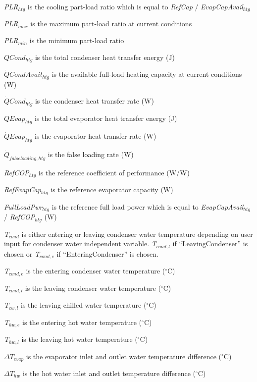 \emph{PLR\(_{htg}\)} is the cooling part-load ratio which is equal to \emph{RefCap} / \emph{EvapCapAvail\(_{htg}\)}

\emph{PLR\(_{max}\)} is the maximum part-load ratio at current conditions

\emph{PLR\(_{min}\)} is the minimum part-load ratio

\(QCon{d_{htg}}\) is the total condenser heat transfer energy (J)

\(\dot QCondAvai{l_{htg}}\) is the available full-load heating capacity at current conditions (W)

\(\dot QCon{d_{htg}}\) is the condenser heat transfer rate (W)

\(QEva{p_{htg}}\) is the total evaporator heat transfer energy (J)

\(\dot QEva{p_{htg}}\) is the evaporator heat transfer rate (W)

\({\dot Q_{falseloading,htg}}\) is the false loading rate (W)

\emph{RefCOP\(_{htg}\)} is the reference coefficient of performance (W/W)

\emph{RefEvapCap\(_{htg}\)} is the reference evaporator capacity (W)

\emph{FullLoadPwr\(_{htg}\)} is the reference full load power which is equal to \emph{EvapCapAvail\(_{htg}\)}/ \emph{RefCOP\(_{htg}\)} (W)

\emph{T\(_{cond}\)} is either entering or leaving condenser water temperature depending on user input for condenser water independent variable. \emph{T\(_{cond,l}\)} if ``LeavingCondenser'' is chosen or \emph{T\(_{cond,e}\)} if ``EnteringCondenser'' is chosen.

\emph{T\(_{cond,e}\)} is the entering condenser water temperature (\(^{\circ}\)C)

\emph{T\(_{cond,l}\)} is the leaving condenser water temperature (\(^{\circ}\)C)

\emph{T\(_{cw,l}\)} is the leaving chilled water temperature (\(^{\circ}\)C)

\emph{T\(_{hw,e}\)} is the entering hot water temperature (\(^{\circ}\)C)

\emph{T\(_{hw,l}\)} is the leaving hot water temperature (\(^{\circ}\)C)

\(\Delta {T_{evap}}\) is the evaporator inlet and outlet water temperature difference (\(^{\circ}\)C)

\(\Delta {T_{hw}}\) is the hot water inlet and outlet temperature difference (\(^{\circ}\)C)

